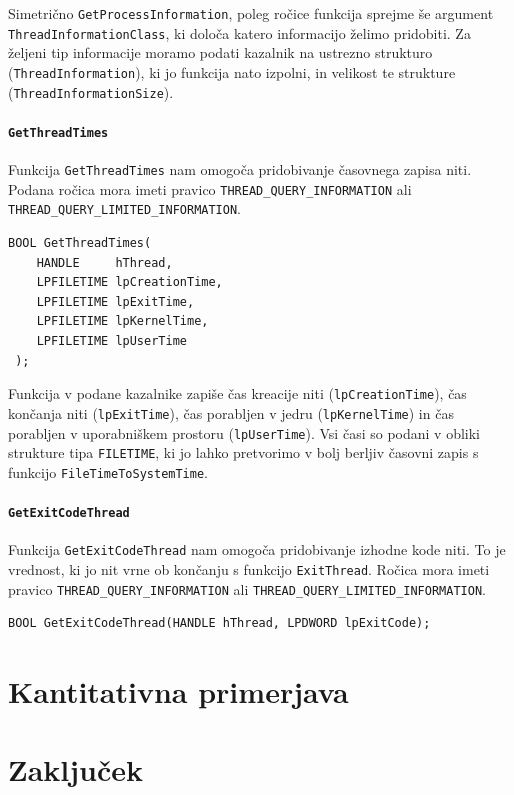 \documentclass[a4paper,12pt,openright]{book}
\begin{document}
Simetrično \texttt{GetProcessInformation}, poleg ročice funkcija sprejme še argument \texttt{ThreadInformationClass}, ki določa katero informacijo želimo pridobiti.
Za željeni tip informacije moramo podati kazalnik na ustrezno strukturo (\texttt{ThreadInformation}), ki jo funkcija nato izpolni, in velikost te strukture (\texttt{ThreadInformationSize}).

\subsubsection{\texttt{GetThreadTimes}}

Funkcija \texttt{GetThreadTimes} nam omogoča pridobivanje časovnega zapisa niti.
Podana ročica mora imeti pravico \texttt{THREAD\_QUERY\_INFORMATION} ali \texttt{THREAD\_QUERY\_LIMITED\_INFORMATION}.

\begin{lstlisting}[style=func]
 BOOL GetThreadTimes(
	HANDLE     hThread,
	LPFILETIME lpCreationTime,
	LPFILETIME lpExitTime,
	LPFILETIME lpKernelTime,
	LPFILETIME lpUserTime
 );
\end{lstlisting}

Funkcija v podane kazalnike zapiše čas kreacije niti (\texttt{lpCreationTime}), čas končanja niti (\texttt{lpExitTime}), čas porabljen v jedru (\texttt{lpKernelTime}) in čas porabljen v uporabniškem prostoru (\texttt{lpUserTime}).
Vsi časi so podani v obliki strukture tipa \texttt{FILETIME}, ki jo lahko pretvorimo v bolj berljiv časovni zapis s funkcijo \texttt{FileTimeToSystemTime}.

\subsubsection{\texttt{GetExitCodeThread}}

Funkcija \texttt{GetExitCodeThread} nam omogoča pridobivanje izhodne kode niti.
To je vrednost, ki jo nit vrne ob končanju s funkcijo \texttt{ExitThread}.
Ročica mora imeti pravico \texttt{THREAD\_QUERY\_INFORMATION} ali \texttt{THREAD\_QUERY\_LIMITED\_INFORMATION}.

\begin{lstlisting}[style=func]
 BOOL GetExitCodeThread(HANDLE hThread, LPDWORD lpExitCode);
\end{lstlisting}

\chapter{Kantitativna primerjava}

\chapter{Zaključek}


\printbibliography[heading=bibintoc,title={Literatura}]
\end{document}
